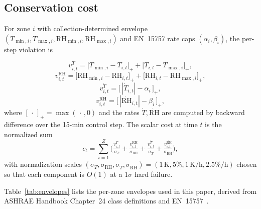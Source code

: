 \documentclass[11pt,a4paper]{article}
\begin{document}
\subsection{Conservation cost}\label{sec:conservation_cost}

For zone $i$ with collection-determined envelope
$(T_{\min,i},T_{\max,i},\mathrm{RH}_{\min,i},\mathrm{RH}_{\max,i})$ and
EN~15757 rate caps $(\alpha_i,\beta_i)$, the per-step violation is

\begin{equation}
v^{T}_{i,t}  = \big[T_{\min,i}-T_{i,t}\big]_+ + \big[T_{i,t}-T_{\max,i}\big]_+,
\label{eq:vT}
\end{equation}
\begin{equation}
v^{\mathrm{RH}}_{i,t}= \big[\mathrm{RH}_{\min,i}-\mathrm{RH}_{i,t}\big]_+ +
                       \big[\mathrm{RH}_{i,t}-\mathrm{RH}_{\max,i}\big]_+,
\label{eq:vRH}
\end{equation}
\begin{equation}
v^{\dot T}_{i,t}     = \big[\,|\dot T_{i,t}|-\alpha_i\,\big]_+,
\label{eq:vTdot}
\end{equation}
\begin{equation}
v^{\dot{\mathrm{RH}}}_{i,t} = \big[\,|\dot{\mathrm{RH}}_{i,t}|-\beta_i\,\big]_+,
\label{eq:vRHdot}
\end{equation}
where $[\,\cdot\,]_+=\max(\,\cdot\,,0)$ and the rates $\dot T,
\dot{\mathrm{RH}}$ are computed by backward difference over the 15-min
control step. The scalar cost at time $t$ is the normalized sum
\begin{equation}
c_t = \sum_{i=1}^{Z}\Big(
   \tfrac{v^{T}_{i,t}}{\sigma_T}
 + \tfrac{v^{\mathrm{RH}}_{i,t}}{\sigma_{\mathrm{RH}}}
 + \tfrac{v^{\dot T}_{i,t}}{\sigma_{\dot T}}
 + \tfrac{v^{\dot{\mathrm{RH}}}_{i,t}}{\sigma_{\dot{\mathrm{RH}}}}\Big),
\label{eq:cost}
\end{equation}
with normalization scales $(\sigma_T,\sigma_{\mathrm{RH}},\sigma_{\dot T},
\sigma_{\dot{\mathrm{RH}}})=(1\,\mathrm{K},5\%,1\,\mathrm{K/h},2.5\%/\mathrm{h})$
chosen so that each component is $O(1)$ at a $1\sigma$ hard failure.

Table~\ref{tab:envelopes} lists the per-zone envelopes used in this
paper, derived from ASHRAE Handbook Chapter~24 class definitions
\citep{ashrae_handbook_ch24} and EN~15757~\citep{en15757}.
\end{document}
